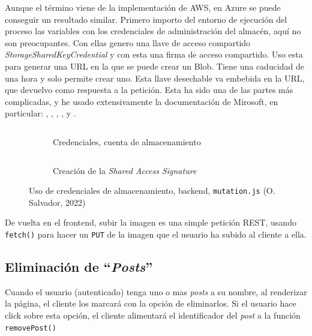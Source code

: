 \documentclass[11pt]{article}
\begin{document}
\begin{flushleft}
	Aunque el término viene de la implementación de AWS, en Azure se puede conseguir un resultado similar. Primero importo del entorno de ejecución del proceso las variables con los credenciales de administración del almacén, aquí no son preocupantes. Con ellas genero una llave de acceso compartido \textit{StorageSharedKeyCredential} y con esta una firma de acceso compartido. Uso esta para generar una URL en la que se puede crear un Blob. Tiene una caducidad de una hora y solo permite crear uno. Esta llave desechable va embebida en la URL, que devuelvo como respuesta a la petición. Esta ha sido una de las partes más complicadas, y he usado extensivamente la documentación de Mirosoft, en particular: \cite{ms_add_blob1}, \cite{ms_add_blob2}, \cite{ms_add_blob3}, \cite{ms_add_blob4}, y \cite{ms_add_blob5}.
	\linebreak
	
		\begin{figure}[htb]
			\centering
			\begin{subfigure}{0.41\textwidth}
				\inputminted[fontsize=\scriptsize, firstline=24, lastline=27, frame=single, breaklines, gobble=7]{javascript}{../../backend/src/resolvers/mutation.js}
				\vspace{.45cm}
				\caption{Credenciales, cuenta de almacenamiento}
			\end{subfigure}
			\hspace{1cm}
			\begin{subfigure}{0.5\textwidth}
				\inputminted[fontsize=\scriptsize, firstline=34, lastline=38, frame=single, breaklines, gobble=7]{javascript}{../../backend/src/resolvers/mutation.js}
				\caption{Creación de la \textit{Shared Access Signature}}
			\end{subfigure}
						
			\caption{Uso de credenciales de almacenamiento, backend, \texttt{mutation.js} (O. Salvador, 2022)}
		\end{figure}
		
	De vuelta en el frontend, subir la imagen es una simple petición REST, usando \texttt{fetch()} para hacer un \texttt{PUT} de la imagen que el usuario ha subido al cliente a ella.

	
	
	\clearpage
	\subsection{Eliminación de ``\textit{Posts}''}
	Cuando el usuario (autenticado) tenga uno o mas \textit{posts} a su nombre, al renderizar la página, el cliente los marcará con la opción de eliminarlos. Si el usuario hace click sobre esta opción, el cliente alimentará el identificador del \textit{post} a la función \texttt{removePost()} 
	\linebreak
	

\end{flushleft}
\end{document}
